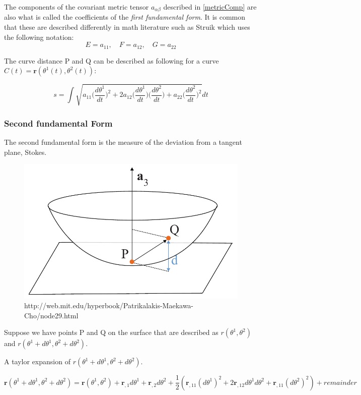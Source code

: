 The components of the covariant metric tensor $a_{\alpha \beta}$ described in \ref{metricComp} are also what is called the coefficients of the \textit{first fundamental form}.
It is common that these are described differently in math literature such as Struik which uses the following notation:
$$ E= a_{11} ,\quad  F = a_{12},\quad
 G = a_{22}$$

The curve distance P and Q can be described as following for a curve $ \textit{C}(t) = \textbf{r}(\theta^1(t),\theta^2(t))$:

$$s = \int { \sqrt { a_{11} \Big(\frac{d\theta^1 }{dt}\Big)^2+2a_{12}\Big(\frac{d\theta^1 }{dt}\Big)\Big(\frac{d\theta^2 }{dt}\Big)  +a_{22} \Big(\frac{d\theta^2 }{dt}\Big)^2 }  } dt$$



\subsubsection{Second fundamental Form}

The second fundamental form is the measure of the deviation from a tangent plane, Stokes.

\begin{figure}[H]
\centering
\includegraphics[width = 0.7\linewidth ]{figure/Theory/SecondFFil.pdf}
\caption{http://web.mit.edu/hyperbook/Patrikalakis-Maekawa-Cho/node29.html}
\end{figure}

Suppose we have points P and Q on the surface that are described as $r(\theta^1, \theta^2)$ and $r(\theta^1 + d\theta^1, \theta^2 + d\theta^2)$.

A taylor expansion of $r(\theta^1 + d\theta^1, \theta^2 + d\theta^2)$.

$$
\textbf{r}(\theta^1 + d\theta^1, \theta^2 + d\theta^2)= \textbf{r}(\theta^1, \theta^2) + \textbf{r}_{,1} d\theta^1 + \textbf{r}_{,2} d\theta^2 + \frac{1}{2}(\textbf{r}_{,11}(d\theta^1)^2 + 2\textbf{r}_{,12}d\theta^1 d\theta^2 + \textbf{r}_{,11}(d\theta^2)^2) + remainder
$$

